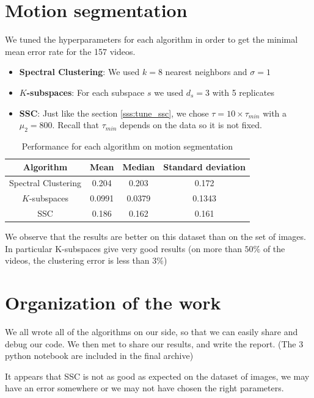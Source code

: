 \documentclass[a4paper, 11pt]{article}
\begin{document}
\section{Motion segmentation}

We tuned the hyperparameters for each algorithm in order to get the minimal mean error rate for the 157 videos.

\begin{itemize}
    \item \textbf{Spectral Clustering}: We used $k = 8$ nearest neighbors and $\sigma = 1$
    \item \textbf{$K$-subspaces}: For each subspace $s$ we used $d_s = 3$ with 5 replicates
    \item \textbf{SSC}: Just like the section \ref{sss:tune_ssc}, we chose $\tau = 10\times \tau_{min}$ with a $\mu_2 = 800$. Recall that $\tau_{min}$ depends on the data so it is not fixed.
\end{itemize}

\begin{table}[H]
    \centering
      \caption{Performance for each algorithm on motion segmentation}
    \begin{tabular}{|c|c|c|c|}
        \hline
        Algorithm & Mean & Median & Standard deviation\\
        \hline
        Spectral Clustering & 0.204 & 0.203 & 0.172\\
        \hline
        $K$-subspaces & 0.0991 & 0.0379 & 0.1343\\
        \hline
        SSC & 0.186 & 0.162 & 0.161\\
        \hline
    \end{tabular}
\end{table}


We observe that the results are better on this dataset than on the set of images.
In particular K-subspaces give very good results (on more than $50\%$ of the videos, the clustering error is less than $3\%$)

\section{Organization of the work}

We all wrote all of the algorithms on our side, so that we can easily share and debug our code. We then met to share our results, and write the report. (The 3 python notebook are included in the final archive)

It appears that SSC is not as good as expected on the dataset of images, we may have an error somewhere or we may not have chosen the right parameters.
\end{document}
